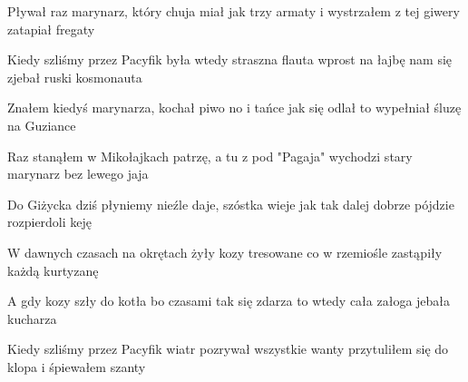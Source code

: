 \documentclass[../../../songbook.tex]{subfiles}
\begin{document}
\begin{multicols}{3}
{Pływał raz marynarz, który \newline
chuja miał jak trzy armaty \newline
i wystrzałem z tej giwery \newline
zatapiał fregaty \newline

Kiedy szliśmy przez Pacyfik \newline
była wtedy straszna flauta \newline
wprost na łajbę nam się zjebał \newline
ruski kosmonauta \newline

Znałem kiedyś marynarza, \newline
kochał piwo no i tańce \newline
jak się odlał to wypełniał \newline
śluzę na Guziance \newline

Raz stanąłem w Mikołajkach \newline
patrzę, a tu z pod "Pagaja" \newline
wychodzi stary marynarz \newline
bez lewego jaja \newline

Do Giżycka dziś płyniemy \newline
nieźle daje, szóstka wieje \newline
jak tak dalej dobrze pójdzie \newline
rozpierdoli keję \newline

W dawnych czasach na okrętach \newline
żyły kozy tresowane \newline
co w rzemiośle zastąpiły \newline
każdą kurtyzanę \newline

A gdy kozy szły do kotła \newline
bo czasami tak się zdarza \newline
to wtedy cała załoga \newline
jebała kucharza \newline

Kiedy szliśmy przez Pacyfik \newline
wiatr pozrywał wszystkie wanty \newline
przytuliłem się do klopa \newline
i śpiewałem szanty \newline

}
\end{multicols}
\end{document}
